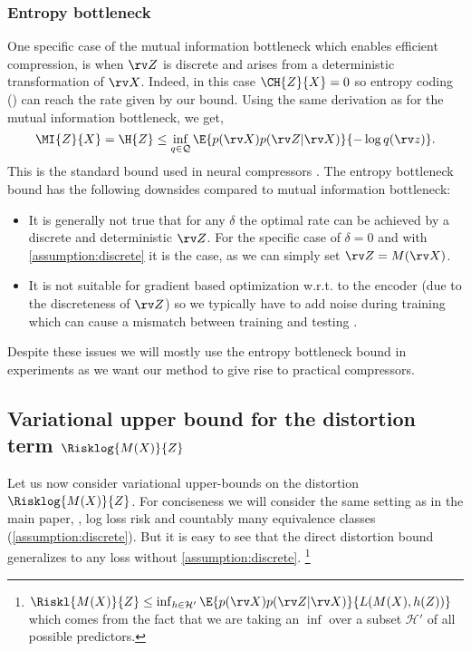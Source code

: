 \documentclass[final]{article}
\begin{document}
\subsubsection{Entropy bottleneck}
\label{appx:entropy_bottleneck}

One specific case of the mutual information bottleneck which enables efficient compression, is when $\rv Z$ is discrete and arises from a deterministic transformation of $\rv X$. 
Indeed, in this case $\CH{Z}{X}=0$ so entropy coding (\eg \cite{rissanen_generalized_1976,duda_asymmetric_2009}) can reach the rate given by our bound.
Using the same derivation as for the mutual information bottleneck, we get,
\begin{equation}\label{eq:HZ_bound}
\MI{Z}{X} = \H{Z}  \leq \inf_{q \in \mathcal{Q}} \E{ p(\rv X)p(\rv Z | \rv X) } {- \log q(\rv z)}.
\end{equation}
This is the standard bound used in neural compressors \cite{balle_end--end_2017,theis_lossy_2017}.
The entropy bottleneck bound has the following downsides compared to mutual information bottleneck:
\begin{itemize}
\item It is generally not true that for any $\delta$ the optimal rate can be achieved by a discrete and deterministic $\rv Z$.
For the specific case of $\delta=0$ and with \cref{assumption:discrete} it is the case, as we can simply set $\rv Z = M(\rv X)$.
\item It is not suitable for gradient based optimization w.r.t. to the encoder (due to the discreteness of $\rv Z$) so we typically have to add noise during training \cite{balle_end--end_2017} which can cause a mismatch between training and testing \cite{agustsson_universally_2020}.
\end{itemize}

Despite these issues we will mostly use the entropy bottleneck bound in experiments as we want our method to give rise to practical compressors.

\subsection{Variational upper bound for the distortion term 
\texorpdfstring{$\Risklog{M(X)}{Z}$}{R[M(X)|Z]}}
\label{appx:variational_distortion}


Let us now consider variational upper-bounds on the distortion $\Risklog{M(X)}{Z}$.
For conciseness we will consider the same setting as in the main paper, \ie, log loss risk and countably many equivalence classes (\cref{assumption:discrete}).
But it is easy to see that the direct distortion bound generalizes to any loss without \cref{assumption:discrete}. \footnote{$\Riskl{M(X)}{Z} \leq \inf_{h \in \mathcal{H}'} \E{p(\rv X)p(\rv Z |\rv X)}{L(M(X),h(Z))}$ which comes from the fact that we are taking an $\inf$ over a subset $\mathcal{H}'$ of all possible predictors.}
\end{document}
